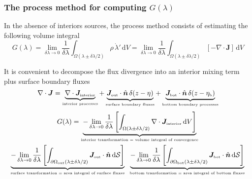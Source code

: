 \documentclass[10pt]{beamer}
\begin{document}
\begin{frame}
  \frametitle{The process method for computing $G(\lambda)$}
\scriptsize 

\begin{exampleblock}{}
 
  In the absence of interiors sources, the process method consists of
  estimating the following volume integral
\begin{equation*}
 G(\lambda) 
 = 
\lim_{\delta \lambda \rightarrow 0}
 \frac{1}{\delta \lambda}
 \int_{\Omega(\lambda \pm \delta \lambda/2)} \rho \, \dot{\lambda}' \, \mathrm{d}V
=
\lim_{\delta \lambda \rightarrow 0}
 \frac{1}{\delta \lambda}
 \int_{\Omega(\lambda \pm \delta \lambda/2)} [-\nabla \cdot {\bm J} ] \, \mathrm{d}V
\end{equation*}

\end{exampleblock}

It is convenient to decompose the flux divergence into an interior
mixing term plus surface boundary fluxes 
\begin{equation*}
  \nabla \cdot {\bm J} =    \underbrace{ \nabla \cdot {\bm J}_{\mbox{\tiny interior}}
     }_{\mbox{\tiny interior processes}} 
  + \underbrace{ {\bm J}_{\mbox{\tiny out}} \cdot \hat{\bm n} \, \delta (z-\eta)
      }_{\mbox{\tiny surface boundary fluxes}}
  + \underbrace{ {\bm J}_{\mbox{\tiny bot}} \cdot \hat{\bm n} \, \delta (z-\eta_{\mbox{\tiny b}})
     }_{\mbox{\tiny bottom boundary processes}}
\end{equation*}
\begin{multline*}
 G(\lambda)
 =
 \underbrace{
  -\lim_{\delta \lambda \rightarrow 0}
 \frac{1}{\delta \lambda}
 \left[ \int_{\Omega(\lambda \pm \delta \lambda/2)} \nabla \cdot {\bm J}_{\mbox{\tiny interior}} \, \mathrm{d}V
  \right]
  }_{\mbox{\tiny interior transformation = volume integral of convergence}}
 \\
 \underbrace{
  -\lim_{\delta \lambda \rightarrow 0}
 \frac{1}{\delta \lambda}
 \left[ \int_{\partial \Omega_{\mbox{\tiny out}} (\lambda \pm \delta \lambda/2)} 
{\bm J}_{\mbox{\tiny out}} \cdot \hat{\bm n} \, \mathrm{d}\mathcal{S}
  \right]
 }_{\mbox{\tiny surface transformation = area integral of surface fluxes}}
\; \;
 \underbrace{
  -\lim_{\delta \lambda \rightarrow 0}
 \frac{1}{\delta \lambda}
 \left[ \int_{\partial \Omega_{\mbox{\tiny  bot}} (\lambda \pm \delta \lambda/2)} 
{\bm J}_{\mbox{\tiny bot}} \cdot \hat{\bm n} \, \mathrm{d}\mathcal{S}
  \right]
 }_{\mbox{\tiny bottom transformation = area integral of bottom fluxes}}
\end{multline*}


\end{frame}
\end{document}
